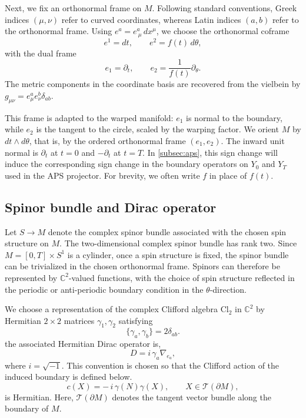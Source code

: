 \documentclass[11pt]{article}
\theoremstyle{definition}
\numberwithin{equation}{section}
\begin{document}
Next, we fix an orthonormal frame on $M$. Following standard conventions, Greek indices $(\mu,\nu)$ refer to curved coordinates, whereas Latin indices $(a,b)$ refer to the orthonormal frame. Using $e^a=e^a_{\ \mu}\,dx^\mu$, we choose the orthonormal coframe
\begin{equation}
e^1=dt,\qquad e^2=f(t)\,d\theta,
\end{equation}
with the dual frame
\begin{equation}
e_1=\partial_t,\qquad e_2=\frac{1}{f(t)}\partial_\theta.
\end{equation}
The metric components in the coordinate basis are recovered from the vielbein by $g_{\mu \nu} = e^{a}_{\mu} e^{b}_{\nu} \delta_{ab}$.

This frame is adapted to the warped manifold: $e_1$ is normal to the boundary, while $e_2$ is the tangent to the circle, scaled by the warping factor. We orient $M$ by $dt\wedge d\theta$, that is, by the ordered orthonormal frame $(e_1,e_2)$. The inward unit normal is $\partial_t$ at $t=0$ and $-\partial_t$ at $t=T$. In \autoref{subsec:aps}, this sign change will induce the corresponding sign change in the boundary operators on $Y_0$ and $Y_T$ used in the APS projector. For brevity, we often write $f$ in place of $f(t)$.


\subsection{Spinor bundle and Dirac operator}\label{subsec:diracop}
Let $S \to  M$ denote the complex spinor bundle associated with the chosen spin structure on $M$.
The two-dimensional complex spinor bundle has rank two. Since \(M=[0,T]\times S^1\) is a cylinder, once a spin structure is fixed, the spinor bundle can be trivialized in the chosen orthonormal frame. Spinors can therefore be represented by \(\mathbb C^2\)-valued functions, with the choice of spin structure reflected in the periodic or anti-periodic boundary condition in the \(\theta\)-direction.

We choose a representation of the complex Clifford algebra \(\mathrm{Cl}_2\) in \(\mathbb C^2\) by Hermitian \(2\times 2\) matrices \(\gamma_1,\gamma_2\) satisfying
\begin{equation}
\{\gamma_a,\gamma_b\}=2\delta_{ab}.
\end{equation}
the associated Hermitian Dirac operator is,
\begin{equation}
D=i\,\gamma_a\nabla_{e_a},
\end{equation}
where \(i=\sqrt{-1}\). This convention is chosen so that the Clifford action of the induced boundary is defined below.
\begin{equation}
c(X)=-\,i\,\gamma(N)\gamma(X),\qquad X\in \mathcal{T}(\partial M),
\end{equation}
is Hermitian. Here, \(\mathcal{T}(\partial M)\) denotes the tangent vector bundle along the boundary of \(M\).
\end{document}
